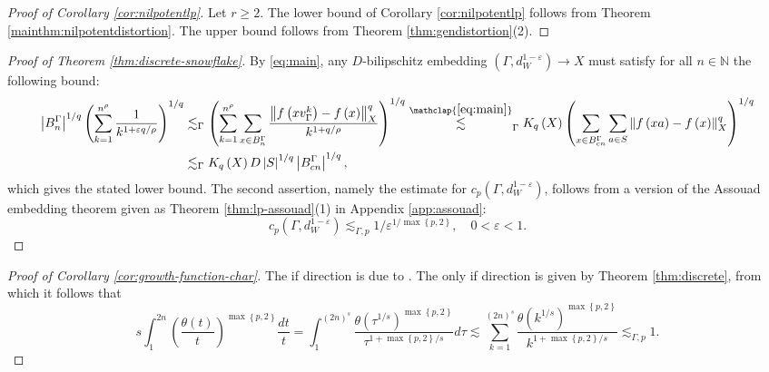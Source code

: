 \documentclass[11pt,reqno]{amsart}
\newcommand{\1}{\mathbf 1}
\begin{document}
\begin{proof}[Proof of Corollary \ref{cor:nilpotentlp}]
Let $r\ge 2$. The lower bound of Corollary \ref{cor:nilpotentlp} follows from Theorem \ref{mainthm:nilpotentdistortion}. The upper bound follows from Theorem \ref{thm:gendistortion}(2).
\end{proof}



\begin{proof}[Proof of Theorem \ref{thm:discrete-snowflake}]
By \eqref{eq:main}, any $D$-bilipschitz embedding $\left(\Gamma,d_W^{1-\varepsilon}\right) \to X$ must satisfy for all $n\in \mathbb{N}$ the following bound:
\begin{align*}
\left|B_n^\Gamma\right|^{1/q}\left(\sum_{k=1}^{n^\rho}\frac 1{k^{1+\varepsilon q/\rho}}\right)^{1/q}&\lesssim_\Gamma
\left(\sum_{k=1}^{n^\rho}\sum_{x\in B^\Gamma_n}\frac{ \left\|f\left(xv_\Gamma^k\right)-f\left(x\right)\right\|_X^q}{k^{1+q/\rho}}\right)^{1/q}\stackrel{\mathclap{\eqref{eq:main}}}{\lesssim}_{\Gamma}
K_q\left(X\right)\left( \sum_{x\in B^\Gamma_{cn}} \sum_{a\in S}\left\|f\left(xa\right)-f\left(x\right)\right\|^q_X\right)^{1/q}\\
&\lesssim_\Gamma
 K_q\left(X\right) D\left|S\right|^{1/q}\left|B_{cn}^\Gamma\right|^{1/q},
\end{align*}
which gives the stated lower bound. The second assertion, namely the estimate for $c_p\left(\Gamma, d_W^{1-\varepsilon}\right)$, follows from a version of the Assouad embedding theorem \cite{assouad1983plongements} given as Theorem \ref{thm:lp-assouad}(1) in Appendix \ref{app:assouad}:
\begin{equation*}
c_p\left(\Gamma,d_W^{1-\varepsilon}\right)\lesssim_{\Gamma,p} 1/\varepsilon^{1/\max\left\{p,2\right\}},\quad 0<\varepsilon<1.
\end{equation*}
\end{proof}

\begin{proof}[Proof of Corollary \ref{cor:growth-function-char}]
    The if direction is due to \cite[Theorem 1]{tessera2011asymptotic}. The only if direction is given by Theorem \ref{thm:discrete}, from which it follows that
\[
s \int_1^{2n} \left(\frac{\theta\left(t\right)}{t}\right)^{\max\left\{p,2\right\}}\frac{dt}{t}=\int_1^{\left(2n\right)^s} \frac{\theta\left(\tau^{1/s}\right)^{\max\left\{p,2\right\}}}{\tau^{1+\max\left\{p,2\right\}/s}}d\tau\lesssim \sum_{k=1}^{\left(2n\right)^s} \frac{\theta\left(k^{1/s}\right)^{\max\left\{p,2\right\}}}{k^{1+\max\left\{p,2\right\}/s}}\lesssim_{\Gamma,p} 1. 
\]
\end{proof}
\end{document}
